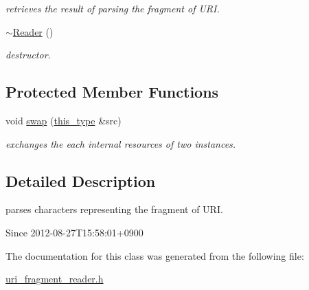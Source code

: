 \begin{DoxyCompactItemize}
\begin{DoxyCompactList}\small\item\em retrieves the result of parsing the fragment of U\-R\-I. \end{DoxyCompactList}\item 
\hypertarget{classhryky_1_1uri_1_1fragment_1_1_reader_a299c24286c722b66bd18292386c751f2}{\hyperlink{classhryky_1_1uri_1_1fragment_1_1_reader_a299c24286c722b66bd18292386c751f2}{$\sim$\-Reader} ()}\label{classhryky_1_1uri_1_1fragment_1_1_reader_a299c24286c722b66bd18292386c751f2}

\begin{DoxyCompactList}\small\item\em destructor. \end{DoxyCompactList}\end{DoxyCompactItemize}
\subsection*{Protected Member Functions}
\begin{DoxyCompactItemize}
\item 
\hypertarget{classhryky_1_1uri_1_1fragment_1_1_reader_ade670a5dbf30602c8a25b61db0e117bd}{void \hyperlink{classhryky_1_1uri_1_1fragment_1_1_reader_ade670a5dbf30602c8a25b61db0e117bd}{swap} (\hyperlink{classhryky_1_1uri_1_1fragment_1_1_reader_ae537bbb2c10b19dc5e44b148a67132f0}{this\-\_\-type} \&src)}\label{classhryky_1_1uri_1_1fragment_1_1_reader_ade670a5dbf30602c8a25b61db0e117bd}

\begin{DoxyCompactList}\small\item\em exchanges the each internal resources of two instances. \end{DoxyCompactList}\end{DoxyCompactItemize}


\subsection{Detailed Description}
parses characters representing the fragment of U\-R\-I. 

\begin{DoxySince}{Since}
2012-\/08-\/27\-T15\-:58\-:01+0900 
\end{DoxySince}


The documentation for this class was generated from the following file\-:\begin{DoxyCompactItemize}
\item 
\hyperlink{uri__fragment__reader_8h}{uri\-\_\-fragment\-\_\-reader.\-h}\end{DoxyCompactItemize}
